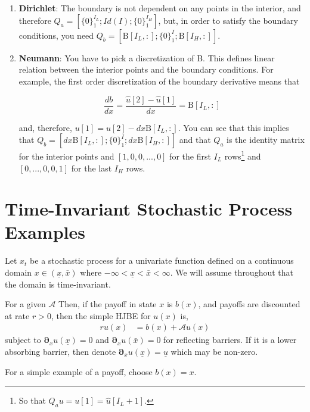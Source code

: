 \documentclass[11pt]{article}
\newcommand{\D}[1][]{\ensuremath{\boldsymbol{\partial}_{#1}}}
\newcommand{\A}{\ensuremath{\mathcal{A}}}
\begin{document}
\begin{itemize}
\begin{enumerate}
	\item \textbf{Dirichlet}: The boundary is not dependent on any points in the interior, and therefore $Q_a = [\{0\}_1^{I_L};Id(I);\{0\}_1^{I_H}]$, but, in order to satisfy the boundary conditions, you need $ Q_b=[\text{B}[I_L,:];\{0\}_1^I;\text{B}[I_H,:]]$.
			
	\item \textbf{Neumann}: You have to pick a discretization of B. 
			This defines linear relation between the interior points and the boundary conditions. For example, the first order discretization of the boundary derivative means that 
			
	\begin{equation}
		\frac{db}{dx} = \frac{\hat{u}[2] - \hat{u}[1]}{dx} = \text{B}[I_L,:]
	\end{equation}
			
	and, therefore, $u[1] = u[2] - dx\text{B}[I_L,:]$. You can see that this implies that $Q_b = [dx\text{B}[I_L,:];\{0\}_1^I;dx \text{B}[I_H,:]]$ and that $Q_a$ is the identity matrix for the interior points and $[1,0, 0,...,0]$ for the first $I_L$ rows\footnote{So that $Q_a u = u[1] = \hat{u}[I_L+1]$.} and $[0,...,0,0,1]$ for the last $I_H$ rows.%
			
\end{enumerate}
\end{itemize}

\section{Time-Invariant Stochastic Process Examples}
Let $x_t$ be a stochastic process for a univariate function defined on a continuous domain $x \in (\underline{x}, \bar{x})$ where $-\infty < \underline{x} < \bar{x} < \infty$.  We will assume throughout that the domain is time-invariant.

For a given $\A$ Then, if the payoff in state $x$ is $b(x)$, and payoffs are discounted at rate $r > 0$, then the simple HJBE for $u(x)$ is,
\begin{align}
r u(x) &= b(x) + \A u(x)\label{eq:general-stationary-HJBE}
\end{align}
subject to $\D[x]u(\underline{x}) = 0$ and $\D[x]u(\bar{x}) = 0$ for reflecting barriers.  If it is a lower absorbing barrier, then denote $\D[x]u(\underline{x}) = \underline{u}$ which may be non-zero.

For a simple example of a payoff, choose $b(x) = x$.
\end{document}
